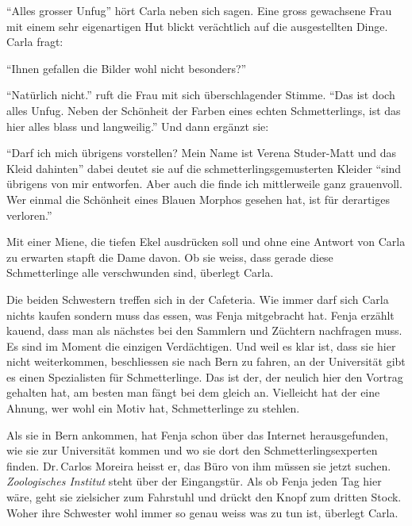 \enquote{Alles grosser Unfug} hört Carla neben sich sagen. Eine gross gewachsene Frau mit einem sehr eigenartigen Hut blickt verächtlich auf die ausgestellten Dinge. Carla fragt:

\enquote{Ihnen gefallen die Bilder wohl nicht besonders?}

\enquote{Natürlich nicht.} ruft die Frau mit sich überschlagender Stimme. \enquote{Das ist doch alles Unfug. Neben der Schönheit der Farben eines echten Schmetterlings, ist das hier alles blass und langweilig.} Und dann ergänzt sie:

\enquote{Darf ich mich übrigens vorstellen? Mein Name ist Verena Studer-Matt und das Kleid dahinten} dabei deutet sie auf die schmetterlingsgemusterten Kleider \enquote{sind übrigens von mir entworfen. Aber auch die finde ich mittlerweile ganz grauenvoll. Wer einmal die Schönheit eines Blauen Morphos gesehen hat, ist für derartiges verloren.} 


Mit einer Miene, die tiefen Ekel ausdrücken soll und ohne eine Antwort von Carla zu erwarten stapft die Dame davon. Ob sie weiss, dass gerade diese Schmetterlinge alle verschwunden sind, überlegt Carla.

Die beiden Schwestern treffen sich in der Cafeteria. Wie immer darf sich Carla nichts kaufen sondern muss das essen, was Fenja mitgebracht hat. Fenja erzählt kauend, dass man als nächstes bei den Sammlern und Züchtern nachfragen muss. Es sind im Moment die einzigen Verdächtigen. Und weil es klar ist, dass sie hier nicht weiterkommen, beschliessen sie nach Bern zu fahren, an der Universität gibt es einen Spezialisten für Schmetterlinge. Das ist der, der neulich hier den Vortrag gehalten hat, am besten man fängt bei dem gleich an. Vielleicht hat der eine Ahnung, wer wohl ein Motiv hat, Schmetterlinge zu stehlen.
\begin{center}
\aldineleft
\end{center}

 Als sie in Bern ankommen, hat Fenja schon über das Internet herausgefunden, wie sie zur Universität kommen und wo sie dort den Schmetterlingsexperten finden. Dr.\,Carlos Moreira heisst er, das Büro von ihm müssen sie jetzt suchen. \emph{Zoologisches Institut} steht über der Eingangstür. Als ob Fenja jeden Tag hier wäre, geht sie zielsicher zum Fahrstuhl und drückt den Knopf zum dritten Stock. Woher ihre Schwester wohl immer so genau weiss was zu tun ist, überlegt Carla.

